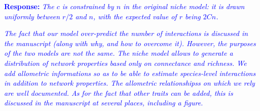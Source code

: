 \documentclass [12pt,onecolumn,twoside,openright]{report}
\begin{document}
\begin{onehalfspacing}
\textcolor{blue}{\textbf{Response:}} \textit{\textcolor{blue}{The $c$ is
constrained by $n$ in the original niche model: it is drawn uniformly
between $r/2$ and $n$, with the expected value of $r$ being $2Cn$.}}

\textit{\textcolor{blue}{The fact that our model over-predict the number of
interactions is discussed in the manuscript (along with why, and how to overcome
it). However, the purposes of the two models are not the same. The niche model
allows to generate a distribution of network properties based only on
connectance and richness. We add allometric informations so as to be able to
estimate species-level interactions in addition to network properties. The
allometric relationshipss on which we rely are well documented. As for the fact
that other traits can be added, this is discussed in the manuscript at several
places, including a figure. }}

\end{onehalfspacing}
\end{document}
